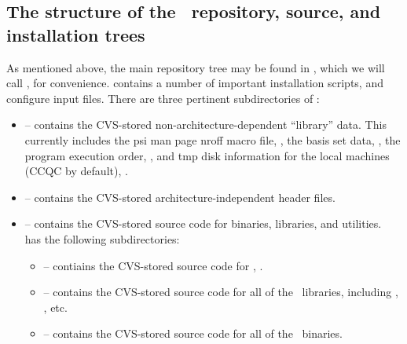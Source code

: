 \subsection{The structure of the \PSIthree\ repository, source, and installation trees} \label{psitree}
As mentioned above, the main repository tree may be found in
, which we will call ,
for convenience.  contains a number of important
installation scripts, and configure input files.
There are three pertinent subdirectories of :
\begin{itemize}
\item {} -- contains the CVS-stored non-architecture-dependent ``library'' data. This
currently includes the psi man page nroff macro file, , the basis
set data, , the program execution order, , and tmp disk
information for the local machines (CCQC by default), . 
\item {} -- contains the CVS-stored architecture-independent header files.
\item {} -- contains the CVS-stored source code for binaries,
libraries, and utilities. \\
 has the following subdirectories:
\begin{itemize}
\item {} -- contiains the CVS-stored source code for , .
\item {} -- contains the CVS-stored source code for all of the \PSIthree\ libraries,
including , , etc.
\item {} -- contains the CVS-stored source code for all of the \PSIthree\ 
binaries. 
\end{itemize}
\end{itemize}

